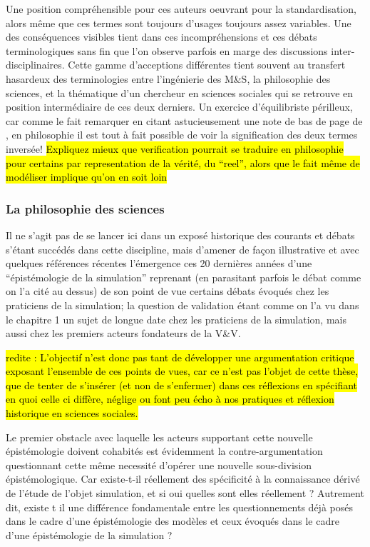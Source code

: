 Une position compréhensible pour ces auteurs oeuvrant pour la standardisation, alors même que ces termes sont toujours d'usages toujours assez variables. Une des conséquences visibles tient dans ces incompréhensions et ces débats terminologiques sans fin \autocite{David2009} que l'on observe parfois en marge des discussions inter-disciplinaires. Cette gamme d'acceptions différentes tient souvent au transfert hasardeux des terminologies entre l'ingénierie des M\&S, la philosophie des sciences, et la thématique d'un chercheur en sciences sociales qui se retrouve en position intermédiaire de ces deux derniers. Un exercice d'équilibriste périlleux, car comme le fait remarquer \textcite{Kleijnen1995} en citant astucieusement une note de bas de page de \textcite{Barlas1990}, en philosophie il est tout à fait possible de voir la signification des deux termes inversée! \hl{Expliquez mieux que verification pourrait se traduire en philosophie pour certains par representation de la vérité, du “reel”, alors que le fait même de modéliser implique qu’on en soit loin}

\subsubsection{La philosophie des sciences}
\label{sssec:philo_sciences}

Il ne s'agit pas de se lancer ici dans un exposé historique des courants et débats s'étant succédés dans cette discipline, mais d'amener de façon illustrative et avec quelques références récentes l'émergence ces 20 dernières années d'une \enquote{épistémologie de la simulation} reprenant (en parasitant parfois le débat comme on l'a cité au dessus) de son point de vue certains débats évoqués chez les praticiens de la simulation; la question de validation étant comme on l'a vu dans le chapitre 1 un sujet de longue date chez les praticiens de la simulation, mais aussi chez les premiers acteurs fondateurs de la V\&V.

\hl{redite : L'objectif n'est donc pas tant de développer une argumentation critique exposant l'ensemble de ces points de vues, car ce n'est pas l'objet de cette thèse, que de tenter de s'insérer (et non de s'enfermer) dans ces réflexions en spécifiant en quoi celle ci diffère, néglige ou font peu écho à nos pratiques et réflexion historique en sciences sociales.}

Le premier obstacle avec laquelle les acteurs supportant cette nouvelle épistémologie doivent cohabités est évidemment la contre-argumentation questionnant cette même necessité d'opérer une nouvelle sous-division épistémologique. Car existe-t-il réellement des spécificité à la connaissance dérivé de l'étude de l'objet simulation, et si oui quelles sont elles réellement ? Autrement dit, existe t il une différence fondamentale entre les questionnements déjà posés dans le cadre d'une épistémologie des modèles et ceux évoqués dans le cadre d'une épistémologie de la simulation ?

